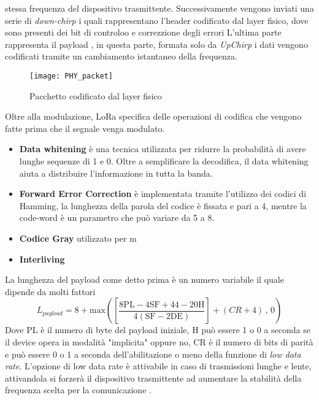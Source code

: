 stessa frequenza del dispositivo trasmittente.
Successivamente vengono inviati una serie di
\emph{down-chirp} i quali rappresentano l'header codificato dal layer fisico,
dove sono presenti dei bit di controloo e correzzione degli errori
L'ultima parte rappresenta il payload , in questa parte, formata solo da
\emph{UpChirp} i dati vengono codificati tramite un cambiamento istantaneo della
frequenza.
\begin{figure}[h]
        \centering 
                \texttt{[image: PHY\_packet]}
        \caption{Pacchetto codificato dal layer fisico}
        \label{fig:freq_lora_chirp}
\end{figure}
Oltre alla modulazione, LoRa specifica delle operazioni di codifica che vengono
fatte prima che il segnale venga modulato.
\begin{itemize}
        \item \textbf{Data whitening} è una tecnica utilizzata per ridurre la
        probabilità di avere lunghe sequenze di 1 e 0. Oltre a semplificare la
        decodifica, il data whitening aiuta a distribuire l'informazione in tutta la
        banda.
        \item \textbf{Forward Error Correction} è implementata tramite
        l'utilizzo dei codici di Hamming, la lunghezza della parola del codice è
        fissata e pari a 4, mentre la code-word è un parametro che può variare
        da 5 a 8.
        \item \textbf{Codice Gray} utilizzato per m 
        \item \textbf{Interliving}
\end{itemize}
La lunghezza del payload come detto prima è un numero variabile il quale dipende
da molti fattori 
\begin{equation}
        L_{payload} = 8+
        \text{max}\left(\left[\frac{8\text{PL}-4\text{SF}+44-20\text{H}}{4(\text{SF}-2\text{DE})}
        \right]+(CR+4)\, , \, 0 \right)
\end{equation}
Dove $\text{PL}$ è il numero di byte del payload iniziale, $\text{H}$ può essere
1 o 0 a seconda se il device opera in modalità "implicita" oppure no,
$\text{CR}$ è il numero di bits di parità e  può essere 0 o 1 a seconda
dell'abilitazione o meno della funzione di \emph{low data rate}.
L'opzione di low data rate è attivabile in caso di trasmissioni lunghe e lente,
attivandola si forzerà il dispositivo trasmittente ad aumentare la stabilità
della frequenza scelta per la comunicazione .

